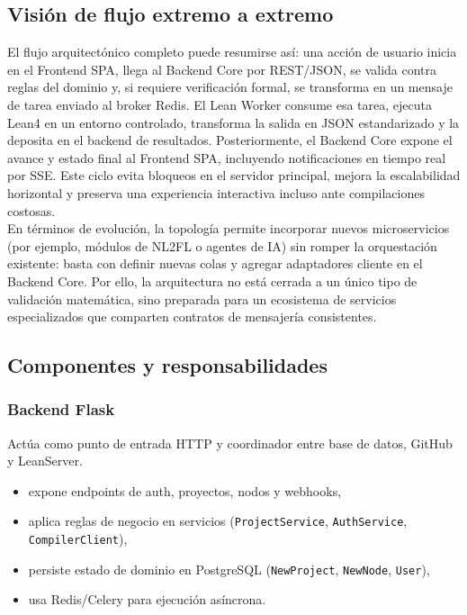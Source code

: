\documentclass[12pt, letterpaper]{article}
\begin{document}
\subsection{Visión de flujo extremo a extremo}

El flujo arquitectónico completo puede resumirse así: una acción de usuario inicia en el Frontend SPA, llega al Backend Core por REST/JSON, se valida contra reglas del dominio y, si requiere verificación formal, se transforma en un mensaje de tarea enviado al broker Redis. El Lean Worker consume esa tarea, ejecuta Lean4 en un entorno controlado, transforma la salida en JSON estandarizado y la deposita en el backend de resultados. Posteriormente, el Backend Core expone el avance y estado final al Frontend SPA, incluyendo notificaciones en tiempo real por SSE. Este ciclo evita bloqueos en el servidor principal, mejora la escalabilidad horizontal y preserva una experiencia interactiva incluso ante compilaciones costosas.\\

En términos de evolución, la topología permite incorporar nuevos microservicios (por ejemplo, módulos de NL2FL o agentes de IA) sin romper la orquestación existente: basta con definir nuevas colas y agregar adaptadores cliente en el Backend Core. Por ello, la arquitectura no está cerrada a un único tipo de validación matemática, sino preparada para un ecosistema de servicios especializados que comparten contratos de mensajería consistentes.

\subsection{Componentes y responsabilidades}

\subsubsection{Backend Flask}

Actúa como punto de entrada HTTP y coordinador entre base de datos, GitHub y LeanServer.

\begin{itemize}
    \item expone endpoints de auth, proyectos, nodos y webhooks,
    \item aplica reglas de negocio en servicios (\texttt{ProjectService}, \texttt{AuthService}, \texttt{CompilerClient}),
    \item persiste estado de dominio en PostgreSQL (\texttt{NewProject}, \texttt{NewNode}, \texttt{User}),
    \item usa Redis/Celery para ejecución asíncrona.
\end{itemize}
\end{document}
